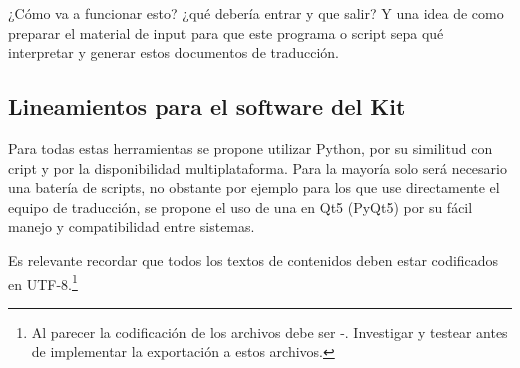  ¿Cómo va a funcionar esto? ¿qué debería entrar y que salir? Y una idea de como preparar el material de input para que este programa o script sepa qué interpretar y generar estos documentos de traducción.

\subsection{Lineamientos para el software del Kit}\label{kit:lineamientos-software-kit}
Para todas estas herramientas se propone utilizar Python, por su similitud con cript y por la disponibilidad multiplataforma. Para la mayoría solo será necesario una batería de scripts, no obstante por ejemplo para los que use directamente el equipo de traducción, se propone el uso de una  en Qt5 (PyQt5) por su fácil manejo y compatibilidad entre sistemas.

Es relevante recordar que todos los textos de contenidos deben estar codificados en UTF-8.\footnote{Al parecer la codificación de los archivos  debe ser -. Investigar y testear antes de implementar la exportación a estos archivos.}